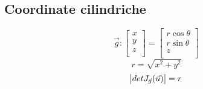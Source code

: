 \documentclass[a4paper,portrait,columns=3,5pt]{cheatsheet}
\begin{document}
\subsection{Coordinate cilindriche}
\begin{equation*}
	\vec{g} :
	\begin{bmatrix}
		x \\
		y \\
		z \\
	\end{bmatrix} =
	\begin{bmatrix}
		r \cos \theta \\
		r \sin \theta \\
		z             \\
	\end{bmatrix}
\end{equation*}
\begin{equation*}
	r = \sqrt{x^2 + y^2}
\end{equation*}
\begin{equation*}
	\abs{detJ_{\vec{g}}(\vec{u})} = r
\end{equation*}
\end{document}
